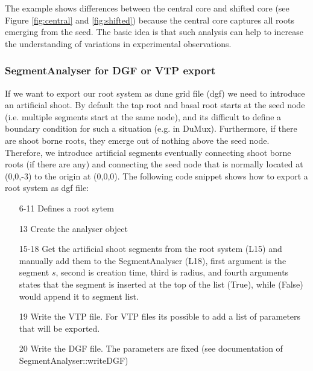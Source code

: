 

The example shows differences between the central core and shifted core (see Figure \ref{fig:central} and \ref{fig:shifted}) because the central core captures all roots emerging from the seed. The basic idea is that such analysis can help to increase the understanding of variations in experimental observations.
% 
% 


\subsubsection*{SegmentAnalyser for DGF or VTP export}

If we want to export our root system as dune grid file (dgf) we need to introduce an artificial shoot. By default the tap root and basal root starts at the seed node (i.e. multiple segments start at the same node), and its difficult to define a boundary condition for such a situation (e.g. in DuMux). Furthermore, if there are shoot borne roots, they emerge out of nothing above the seed node. Therefore, we introduce artificial segments eventually connecting shoot borne roots (if there are any) and connecting the seed node that is normally located at (0,0,-3) to the origin at (0,0,0). The following code snippet shows how to export a root system as dgf file:



\begin{itemize}
 \item[6-11] Defines a root sytem
 \item[13] Create the analyser object
 \item[15-18] Get the artificial shoot segments from the root system (L15) and manually add them to the SegmentAnalyser (L18), first argument is the segment $s$, second is creation time, third is radius, and fourth arguments states that the segment is inserted at the top of the list (True), while (False) would append it to segment list.
 \item[19] Write the VTP file. For VTP files its possible to add a list of parameters that will be exported. 
 \item[20] Write the DGF file. The parameters are fixed (see documentation of SegmentAnalyser::writeDGF)
\end{itemize}

